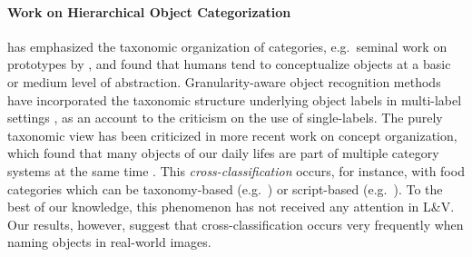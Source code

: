 \paragraph{Work on Hierarchical Object Categorization} 
has emphasized the taxonomic organization of categories, e.g.\ seminal work on prototypes by ,  and found that humans tend to conceptualize objects at a basic or medium level of abstraction.
Granularity-aware object recognition methods have incorporated the taxonomic structure underlying object labels in multi-label settings \cite{deng2014large,wang2014poodle,peterson2018learning}, as an account to the criticism on the use of single-labels. 
The purely taxonomic view has been criticized in more recent work on concept organization, which found that many objects of our daily lifes are part of multiple category systems at the same time \cite{ross1999food,SHAFTO20111}. 
This \textit{cross-classification} occurs, for instance, with food categories which can be taxonomy-based (e.g.\  ) or script-based (e.g.\  ).
To the best of our knowledge, this phenomenon has not received any attention in L\&V.
Our results, however, suggest that cross-classification occurs very frequently when naming objects in real-world images.
%
